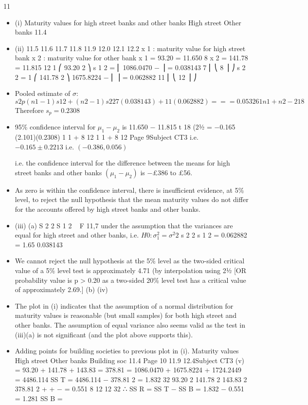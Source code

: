 \documentclass[a4paper,12pt]{article}
\begin{document}
11
\begin{itemize}
\item (i)
Maturity values for high street banks and other banks
High street
Other banks
11.4
\item (ii)
11.5
11.6
11.7
11.8
11.9
12.0
12.1
12.2
x 1 : maturity value for high street bank
x 2 : maturity value for other bank
x 1 = 93.20
= 11.650
8
x 2 = 141.78
= 11.815
12
1 ⎛
93.20 2 ⎞
s 1 2 = ⎜ 1086.0470 −
⎟ = 0.038143
7 ⎜ ⎝
8 ⎟ ⎠
s 2 2 =
1 ⎛
141.78 2 ⎞
1675.8224
−
⎜
⎟ = 0.062882
11 ⎜ ⎝
12 ⎟ ⎠
\item Pooled estimate of $\sigma$:
\[s 2 p
( n 1 − 1) s 1 2 + ( n 2 − 1) s 2 2 7(0.038143) + 11(0.062882)
=
=
= 0.053261
n 1 + n 2 − 2
18\]
Therefore $s_p = 0.2308$
\item 95\% confidence interval for $\mu_{1} − \mu_{2}$ is
11.650 − 11.815 \pm t 18 (21⁄2%
= −0.165 \pm (2.101)(0.2308)
1 1
+
8 12
1 1
+
8 12
Page 9Subject CT3 %
i.e. $−0.165 \pm 0.2213$
i.e. $(−0.386, 0.056)$

i.e. the confidence interval for the difference between the means for high street banks and other banks $(\mu_{1} − \mu_{2} )$ is −£386 to £56.
\item As zero is within the confidence interval, there is insufficient evidence, at 5\% level, to reject the null hypothesis that the mean maturity values do not differ for the accounts offered by high street banks and other banks.
\item (iii)
(a)
S 2 2
S 1 2
~ F 11,7
under the assumption that the variances are equal for high street and
other banks,
i.e. $H 0 : \sigma^2_1 = \sigma^2 2$
s 2 2
s 1 2
=
0.062882
= 1.65
0.038143
\item We cannot reject the null hypothesis at the 5\% level as the two-sided critical value of a 5\% level test is approximately 4.71 (by interpolation using 21⁄2%
[OR probability value is p > 0.20 as a two-sided 20\% level test has a critical value of approximately 2.69.]
(b)
(iv)
\item The plot in (i) indicates that the assumption of a normal distribution for maturity values is reasonable (but small samples) for both high street and other banks. The assumption of equal variance also seems valid as the test in (iii)(a) is not significant (and the plot above supports this).

\item Adding points for building societies to previous plot in (i).
Maturity values
High street
Other banks
Building soc
11.4
Page 10
11.9
12.4Subject CT3 %
(v)
\sigmax = 93.20 + 141.78 + 143.83 = 378.81
 = 1086.0470 + 1675.8224 + 1724.2449 = 4486.114
SS T = 4486.114 −
378.81 2
= 1.832
32
93.20 2 141.78 2 143.83 2 378.81 2
+
+
−
= 0.551
8
12
12
32
∴ SS R = SS T − SS B = 1.832 − 0.551 = 1.281
SS B =


\end{itemize}
\end{document}
